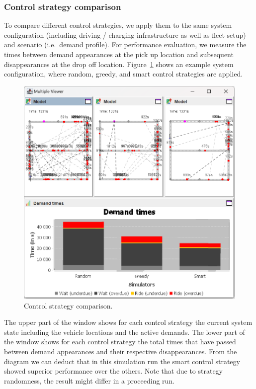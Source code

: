 \documentclass[a4paper,twoside]{article}
\begin{document}
	\subsubsection{Control strategy comparison}
	\label{sec:controller-comparison}
	
	To compare different control strategies, we apply them to the same system configuration (including driving / charging infrastructure as well as fleet setup) and scenario (i.e.\ demand profile).
	For performance evaluation, we measure the times between demand appearances at the pick up location and subsequent disappearances at the drop off location.
	Figure~\ref{fig:controller-comparison} shows an example system configuration, where random, greedy, and smart control strategies are applied.
	\begin{figure}[!ht]
		\centering
		\includegraphics[width=0.85\columnwidth]{controller_comparison.png}
		\caption{Control strategy comparison.}
		\label{fig:controller-comparison}
	\end{figure}
	The upper part of the window shows for each control strategy the current system state including the vehicle locations and the active demands.
	The lower part of the window shows for each control strategy the total times that have passed between demand appearances and their respective disappearances.
	From the diagram we can deduct that in this simulation run the smart control strategy showed superior performance over the others.
	Note that due to strategy randomness, the result might differ in a proceeding run.
	
\end{document}
